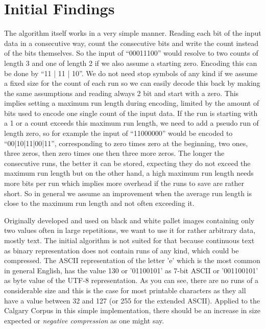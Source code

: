 \section{Initial Findings}
\label{ch:Analysis:sec:Initial Findings}
\par{
	The algorithm itself works in a very simple manner. Reading each bit of the input data in a consecutive way, count the consecutive bits and write the count instead of the bits themselves. So the input of \enquote{00011100} would resolve to two counts of length 3 and one of length 2 if we also assume a starting zero. Encoding this can be done by \enquote{11 | 11 | 10}.  We do not need stop symbols of any kind if we assume a fixed size for the count of each run so we can easily decode this back by making the same assumptions and reading always 2 bit and start with a zero. This implies setting a maximum run length during encoding, limited by the amount of bits used to encode one single count of the input data. If the run is starting with a 1 or a count exceeds this maximum run length, we need to add a pseudo run of length zero, so for example the input of \enquote{11000000} would be encoded to \enquote{00|10|11|00|11}, corresponding to zero times zero at the beginning, two ones, three zeros, then zero times one then three more zeros. The longer the consecutive runs, the better it can be stored, expecting they do not exceed the maximum run length but on the other hand, a high maximum run length needs more bits per run which implies more overhead if the runs to save are rather short. So in general we assume an improvement when the average run length is close to the maximum run length and not often exceeding it. 
}
\par{
	Originally developed and used on black and white pallet images containing only two values often in large repetitions, we want to use it for rather arbitrary data, mostly text. The initial algorithm is not suited for that because continuous text as binary representation does not contain runs of any kind, which could be compressed. The ASCII representation of the letter 'e' which is the most common in general English, has the value 130 or '01100101' as 7-bit ASCII or '001100101' as byte value of the UTF-8 representation. As you can see, there are no runs of a considerable size and this is the case for most printable characters as they all have a value between 32 and 127 (or 255 for the extended ASCII). Applied to the Calgary Corpus in this simple implementation, there should be an increase in size expected or \textit{negative compression} as one might say.
}

